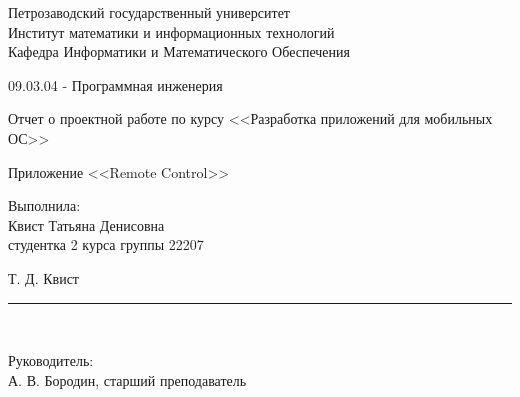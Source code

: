 \documentclass[a4paper,12pt]{article}
\newcommand{\myrule}[1]{\rule{#1}{0.4pt}}
\newcommand{\sign}[2][~]{{\small\myrule{#2}\\[-0.7em]\makebox[#2]{\it #1}}}
\renewcommand{\baselinestretch}{1.50}
\begin{document}

\thispagestyle{empty}
\begin{center}


\renewcommand{\baselinestretch}{1}
{\large
{\sc Петрозаводский государственный университет\\
Институт математики и информационных технологий\\
	Кафедра Информатики и Математического Обеспечения
}
}

\end{center}


\begin{center}
%
%
09.03.04 - Программная инженерия \\
%
% 
\end{center}

\vfill

\begin{center}
{\normalsize Отчет о проектной работе по курсу <<Разработка приложений для мобильных ОС>>} \\

\medskip

	{\Large \sc Приложение <<Remote Control>>} \\
\end{center}

\medskip

\begin{flushright}
\parbox{11cm}{%
\renewcommand{\baselinestretch}{1.2}
\normalsize
	Выполнила:\\
Квист Татьяна Денисовна\\
студентка 2 курса группы 22207
\begin{flushright}
	Т. Д. Квист \sign[подпись]{4cm}
\end{flushright}

Руководитель:\\
А. В. Бородин, старший преподаватель \\

}
\end{flushright}
\end{document}
